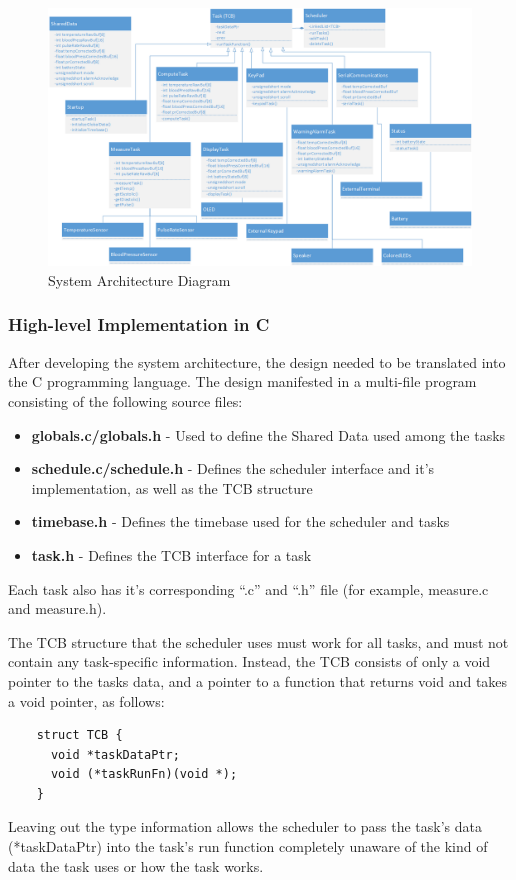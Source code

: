 \documentclass[12pt]{article} %
\begin{document}
    \begin{figure}[h]
      \centering
      \includegraphics[width=\textwidth]{../design/System_Architecture}
      \caption{System Architecture Diagram}
      \label{fig:arch}
    \end{figure}

    \subsubsection{High-level Implementation in C}
    After developing the system architecture, the design needed to be translated into the C programming language. The design manifested in a multi-file program consisting of the following source files:
    \begin{itemize}
      \item \textbf{globals.c/globals.h} - Used to define the Shared Data used among the tasks
      \item \textbf{schedule.c/schedule.h} - Defines the scheduler interface and it's implementation, as well as the TCB structure
      \item \textbf{timebase.h} - Defines the timebase used for the scheduler and tasks
      \item \textbf{task.h} - Defines the TCB interface for a task
    \end{itemize}
    Each task also has it's corresponding ``.c'' and ``.h'' file (for example, measure.c and measure.h).

    The TCB structure that the scheduler uses must work for all tasks, and must not
    contain any task-specific information. Instead, the TCB consists of only a void pointer to the tasks data, and a pointer to a function that returns void and takes a void pointer, as follows:
    \begin{lstlisting}
    struct TCB {
      void *taskDataPtr;
      void (*taskRunFn)(void *);
    }
    \end{lstlisting}
    Leaving out the type information allows the scheduler to pass the task's data
    (*taskDataPtr) into the task's run function completely unaware of the kind of
    data the task uses or how the task works.
\end{document}
